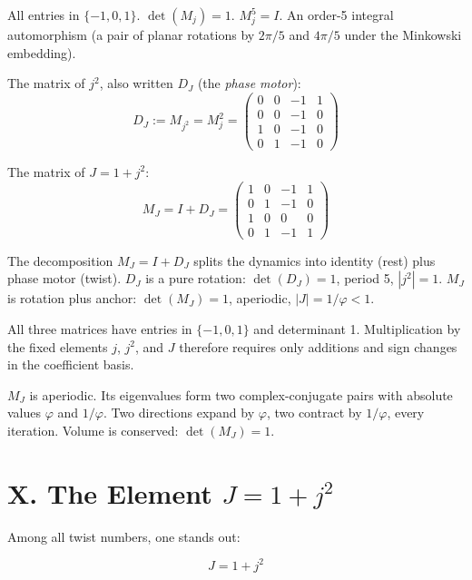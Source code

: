 \documentclass[11pt, a4paper]{article}
\newcommand{\ph}{\varphi}
\begin{document}
All entries in $\{-1, 0, 1\}$. $\det(M_j) = 1$. $M_j^5 = I$. An order-5 integral automorphism (a pair of planar rotations by $2\pi/5$ and $4\pi/5$ under the Minkowski embedding).

The matrix of $j^2$, also written $D_J$ (the \textit{phase motor}):
\begin{equation*}
D_J := M_{j^2} = M_j^2 = \begin{pmatrix} 0 & 0 & -1 & 1 \\ 0 & 0 & -1 & 0 \\ 1 & 0 & -1 & 0 \\ 0 & 1 & -1 & 0 \end{pmatrix}
\end{equation*}

The matrix of $J = 1 + j^2$:
\begin{equation*}
M_J = I + D_J = \begin{pmatrix} 1 & 0 & -1 & 1 \\ 0 & 1 & -1 & 0 \\ 1 & 0 & 0 & 0 \\ 0 & 1 & -1 & 1 \end{pmatrix}
\end{equation*}

The decomposition $M_J = I + D_J$ splits the dynamics into identity (rest) plus phase motor (twist). $D_J$ is a pure rotation: $\det(D_J) = 1$, period 5, $|j^2| = 1$. $M_J$ is rotation plus anchor: $\det(M_J) = 1$, aperiodic, $|J| = 1/\ph < 1$.

All three matrices have entries in $\{-1, 0, 1\}$ and determinant 1. Multiplication by the fixed elements $j$, $j^2$, and $J$ therefore requires only additions and sign changes in the coefficient basis.

$M_J$ is aperiodic. Its eigenvalues form two complex-conjugate pairs with absolute values $\ph$ and $1/\ph$. Two directions expand by $\ph$, two contract by $1/\ph$, every iteration. Volume is conserved: $\det(M_J) = 1$.

\section*{X. The Element $J = 1 + j^2$}

Among all twist numbers, one stands out:

\begin{equation*}
\boxed{J = 1 + j^2}
\end{equation*}
\end{document}
